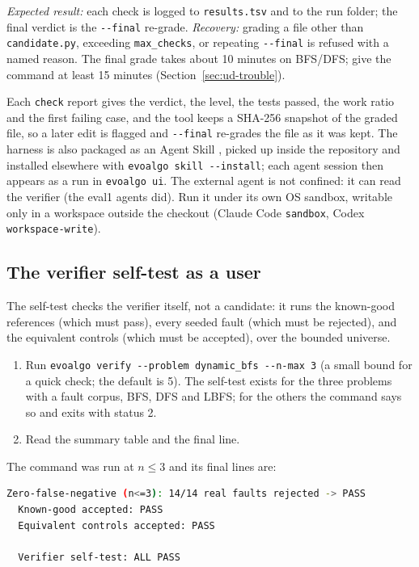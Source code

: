 \emph{Expected result:} each check is logged to \texttt{results.tsv} and to the
run folder; the final verdict is the \texttt{-{}-final} re-grade.
\emph{Recovery:} grading a file other than \texttt{candidate.py}, exceeding
\texttt{max\_checks}, or repeating \texttt{-{}-final} is refused with a named
reason. The final grade takes about 10 minutes on BFS/DFS; give the command at
least 15 minutes (Section~\ref{sec:ud-trouble}).

Each \texttt{check} report gives the verdict, the level, the tests passed, the
work ratio and the first failing case, and the tool keeps a SHA-256 snapshot of
the graded file, so a later edit is flagged and \texttt{-{}-final} re-grades the
file as it was kept. The harness is also packaged as an Agent Skill
\citep{agentskills}, picked up inside the repository and installed elsewhere with
\texttt{evoalgo skill -{}-install}; each agent session then appears as a run in
\texttt{evoalgo ui}. The external agent is not confined: it can read the
verifier (the eval1 agents did). Run it under its own OS sandbox, writable only
in a workspace outside the checkout (Claude Code \texttt{sandbox}, Codex
\texttt{workspace-write}).

\subsection{The verifier self-test as a user}
\label{sec:ud-verify}

The self-test checks the verifier itself, not a candidate: it runs the
known-good references (which must pass), every seeded fault (which must be
rejected), and the equivalent controls (which must be accepted), over the
bounded universe.

\begin{enumerate}
  \item Run \texttt{evoalgo verify -{}-problem dynamic\_bfs -{}-n-max 3} (a small
  bound for a quick check; the default is 5). The self-test exists for the
  three problems with a fault corpus, BFS, DFS and LBFS; for the others the
  command says so and exits with status 2.
  \item Read the summary table and the final line.
\end{enumerate}

The command was run at $n \le 3$ and its final lines are:

\begin{lstlisting}[language=bash, basicstyle=\ttfamily\small]
  Zero-false-negative (n<=3): 14/14 real faults rejected -> PASS
  Known-good accepted: PASS
  Equivalent controls accepted: PASS

  Verifier self-test: ALL PASS
\end{lstlisting}

